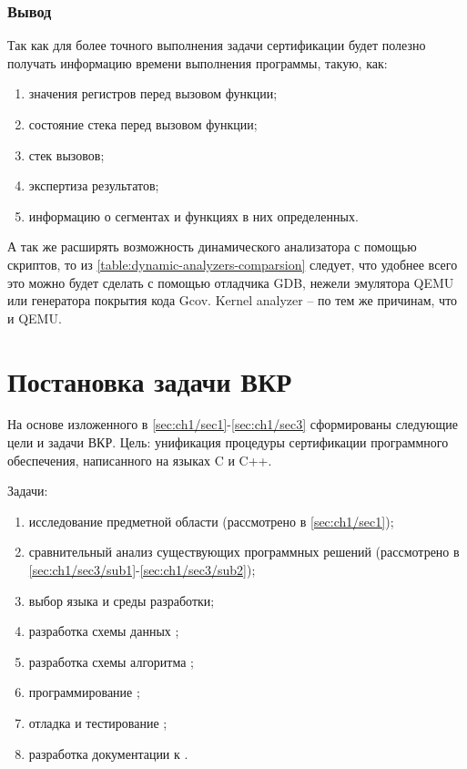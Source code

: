 \subsubsection{Вывод}\label{sec:ch1/sec3/sub2/sub4}
Так как для более точного выполнения задачи сертификации будет полезно получать
информацию времени выполнения программы, такую, как:
\begin{enumerate}[label={\arabic*)}]
    \item значения регистров перед вызовом функции;
    \item состояние стека перед вызовом функции;
    \item стек вызовов;
    \item экспертиза результатов;
    \item информацию о сегментах и функциях в них определенных.
\end{enumerate}
А так же расширять возможность динамического анализатора с помощью скриптов,
то из \autoref{table:dynamic-analyzers-comparsion} следует, что
удобнее всего это можно будет сделать с помощью отладчика GDB,
нежели эмулятора QEMU или генератора покрытия кода Gcov. Kernel analyzer --
по тем же причинам, что и QEMU.


\section{Постановка задачи ВКР}\label{sec:ch1/sec4}
На основе изложенного в \autoref{sec:ch1/sec1}-\autoref{sec:ch1/sec3} сформированы
следующие цели и задачи ВКР.
Цель: унификация процедуры сертификации программного обеспечения, написанного
на языках C и C++.

Задачи:
\begin{enumerate}[label={\arabic*)}]
    \item исследование предметной области (рассмотрено в \autoref{sec:ch1/sec1});
    \item сравнительный анализ существующих программных решений 
        (рассмотрено в \autoref{sec:ch1/sec3/sub1}-\autoref{sec:ch1/sec3/sub2});
    \item выбор языка и среды разработки;
    \item разработка схемы данных {\ProgModule};
    \item разработка схемы алгоритма {\ProgModule};
    \item программирование {\ProgModule};
    \item отладка и тестирование {\ProgModule};
    \item разработка документации к {\ProgModule}.
\end{enumerate}

